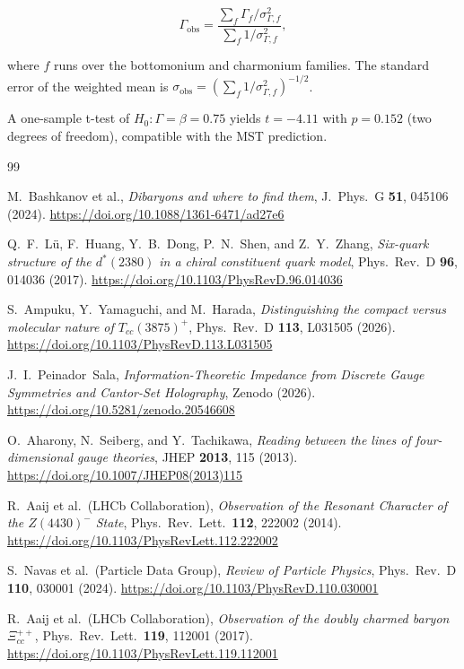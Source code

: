 \documentclass[12pt,a4paper]{article}
\theoremstyle{plain}
\theoremstyle{definition}
\theoremstyle{remark}
\begin{document}
\begin{equation}
\Gamma_{\text{obs}} = \frac{\sum_f \Gamma_f / \sigma_{\Gamma,f}^2}{\sum_f 1/\sigma_{\Gamma,f}^2},
\label{eq:weighted}
\end{equation}

where \(f\) runs over the bottomonium and charmonium families. The standard error of the weighted mean is \(\sigma_{\text{obs}} = (\sum_f 1/\sigma_{\Gamma,f}^2)^{-1/2}\).

A one-sample t-test of \(H_0: \Gamma = \beta = 0.75\) yields \(t = -4.11\) with \(p = 0.152\) (two degrees of freedom), compatible with the MST prediction.

\begin{thebibliography}{99}

M.~Bashkanov et al., 
\emph{Dibaryons and where to find them}, 
J.\ Phys.\ G \textbf{51}, 045106 (2024). 
\url{https://doi.org/10.1088/1361-6471/ad27e6}

Q.~F.~L\"{u}, F.~Huang, Y.~B.~Dong, P.~N.~Shen, and Z.~Y.~Zhang, 
\emph{Six-quark structure of the \(d^*(2380)\) in a chiral constituent quark model}, 
Phys.\ Rev.\ D \textbf{96}, 014036 (2017). 
\url{https://doi.org/10.1103/PhysRevD.96.014036}

S.~Ampuku, Y.~Yamaguchi, and M.~Harada, 
\emph{Distinguishing the compact versus molecular nature of \(T_{cc}(3875)^+\)}, 
Phys.\ Rev.\ D \textbf{113}, L031505 (2026). 
\url{https://doi.org/10.1103/PhysRevD.113.L031505}

J.~I.~Peinador~Sala, 
\emph{Information-Theoretic Impedance from Discrete Gauge Symmetries and Cantor-Set Holography}, 
Zenodo (2026). 
\url{https://doi.org/10.5281/zenodo.20546608}

O.~Aharony, N.~Seiberg, and Y.~Tachikawa, 
\emph{Reading between the lines of four-dimensional gauge theories}, 
JHEP \textbf{2013}, 115 (2013). 
\url{https://doi.org/10.1007/JHEP08(2013)115}

R.~Aaij et al.\ (LHCb Collaboration), 
\emph{Observation of the Resonant Character of the \(Z(4430)^-\) State}, 
Phys.\ Rev.\ Lett.\ \textbf{112}, 222002 (2014). 
\url{https://doi.org/10.1103/PhysRevLett.112.222002}

S.~Navas et al.\ (Particle Data Group), 
\emph{Review of Particle Physics}, 
Phys.\ Rev.\ D \textbf{110}, 030001 (2024). 
\url{https://doi.org/10.1103/PhysRevD.110.030001}

R.~Aaij et al.\ (LHCb Collaboration), 
\emph{Observation of the doubly charmed baryon \(\Xi_{cc}^{++}\)}, 
Phys.\ Rev.\ Lett.\ \textbf{119}, 112001 (2017). 
\url{https://doi.org/10.1103/PhysRevLett.119.112001}

\end{thebibliography}
\end{document}

